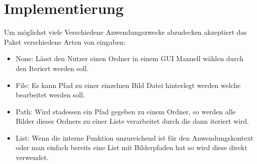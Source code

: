 \chapter{Implementierung}

Um möglichst viele Verschiedene Anwendungszwecke abzudecken akzeptiert das Paket verschiedene Arten von eingaben:
\begin{itemize}
  \item None: Lässt den Nutzer einen Ordner in einem GUI Manuell wählen durch den Iteriert werden soll.
  \item File: Es kann Pfad zu einer einzelnen Bild Datei hinterlegt werden welche bearbeitet werden soll.
  \item Path: Wird stadessen ein Pfad gegeben zu einem Ordner, so werden alle Bilder dieses Ordners zu einer Liste verarbeitet durch die dann iteriert wird.
  \item List: Wenn die interne Funktion unzureichend ist für den Anwendungskontext oder man einfach bereits eine List mit Bilderpfaden hat so wird diese direkt verwendet.
\end{itemize}
